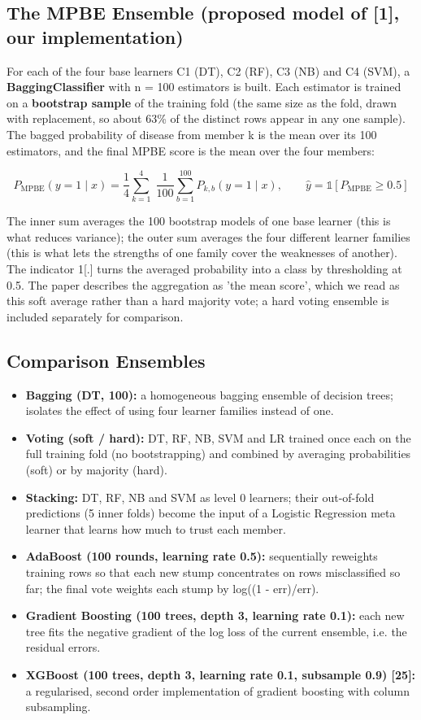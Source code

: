 \documentclass[12pt,a4paper,oneside]{report}
\begin{document}
\subsection{The MPBE Ensemble (proposed model of [1], our implementation)}
For each of the four base learners C1 (DT), C2 (RF), C3 (NB) and C4 (SVM), a \textbf{BaggingClassifier} with n = 100 estimators is built. Each estimator is trained on a \textbf{bootstrap sample} of the training fold (the same size as the fold, drawn with replacement, so about 63\% of the distinct rows appear in any one sample). The bagged probability of disease from member k is the mean over its 100 estimators, and the final MPBE score is the mean over the four members:

\begin{equation}
P_{\text{MPBE}}(y=1\mid x) = \frac{1}{4}\sum_{k=1}^{4}\;\frac{1}{100}\sum_{b=1}^{100} P_{k,b}(y=1\mid x), \qquad \hat{y} = \mathbb{1}\left[P_{\text{MPBE}} \ge 0.5\right]
\end{equation}

The inner sum averages the 100 bootstrap models of one base learner (this is what reduces variance); the outer sum averages the four different learner families (this is what lets the strengths of one family cover the weaknesses of another). The indicator 1[.] turns the averaged probability into a class by thresholding at 0.5. The paper describes the aggregation as 'the mean score', which we read as this soft average rather than a hard majority vote; a hard voting ensemble is included separately for comparison.

\subsection{Comparison Ensembles}
\begin{itemize}
  \item \textbf{Bagging (DT, 100):} a homogeneous bagging ensemble of decision trees; isolates the effect of using four learner families instead of one.
  \item \textbf{Voting (soft / hard):} DT, RF, NB, SVM and LR trained once each on the full training fold (no bootstrapping) and combined by averaging probabilities (soft) or by majority (hard).
  \item \textbf{Stacking:} DT, RF, NB and SVM as level 0 learners; their out-of-fold predictions (5 inner folds) become the input of a Logistic Regression meta learner that learns how much to trust each member.
  \item \textbf{AdaBoost (100 rounds, learning rate 0.5):} sequentially reweights training rows so that each new stump concentrates on rows misclassified so far; the final vote weights each stump by log((1 - err)/err).
  \item \textbf{Gradient Boosting (100 trees, depth 3, learning rate 0.1):} each new tree fits the negative gradient of the log loss of the current ensemble, i.e. the residual errors.
  \item \textbf{XGBoost (100 trees, depth 3, learning rate 0.1, subsample 0.9) [25]:} a regularised, second order implementation of gradient boosting with column subsampling.
\end{itemize}
\end{document}
